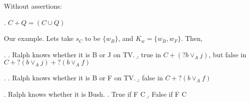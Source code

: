 \documentclass{article}
\begin{document}
\item Without assertions:

\ex.   $C + Q = (C \cup Q)$ 




\item Our example. Lets take $s_C$ to be $\{w_B\}$, and $K_w= \{w_B, w_F\}$. Then,

\ex. \a. Ralph knows whether it is B or J on TV.  
\b. true in $C + (? b \vee_A j)$, but false in $C +  ? (b \vee_A j) +  ? (b \vee_A f)$


\ex. \a. Ralph knows whether it is B  or F on TV.  
\b. false in $C +     ? (b \vee_A f)$

  
  \ex. Ralph   knows  whether it is Bush.
  \a. True if F \not\in C
  \b. False if F \in C
  
  

\eit
\end{document}
